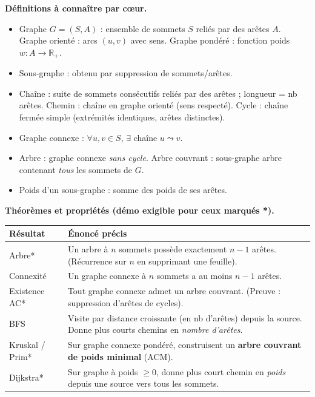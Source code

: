 \documentclass[11pt]{article}
\newcommand{\cle}[1]{{\popxbold\color{popdark}#1}}
\begin{document}
\begin{aretenir}
\textbf{Définitions à connaître par cœur.}
\begin{itemize}
  \item \cle{Graphe} $G = (S, A)$ : ensemble de \cle{sommets} $S$ reliés par des \cle{arêtes} $A$. Graphe \cle{orienté} : arcs $(u,v)$ avec sens. Graphe \cle{pondéré} : fonction poids $w: A \to \mathbb{R}_+$.
  \item \cle{Sous-graphe} : obtenu par suppression de sommets/arêtes.
  \item \cle{Chaîne} : suite de sommets consécutifs reliés par des arêtes ; \cle{longueur} = nb arêtes. \cle{Chemin} : chaîne en graphe orienté (sens respecté). \cle{Cycle} : chaîne fermée simple (extrémités identiques, arêtes distinctes).
  \item \cle{Graphe connexe} : $\forall u,v \in S$, $\exists$ chaîne $u \leadsto v$.
  \item \cle{Arbre} : graphe connexe \emph{sans cycle}. \cle{Arbre couvrant} : sous-graphe arbre contenant \emph{tous} les sommets de $G$.
  \item \cle{Poids d'un sous-graphe} : somme des poids de ses arêtes.
\end{itemize}

\textbf{Théorèmes et propriétés (démo exigible pour ceux marqués *).}
\begin{center}
\begin{tabularx}{\linewidth}{|l|X|}
\hline
\rowcolor{popblueL} \textbf{Résultat} & \textbf{Énoncé précis} \\
\hline
Arbre* & Un arbre à $n$ sommets possède exactement $n-1$ arêtes. (Récurrence sur $n$ en supprimant une feuille). \\
\hline
Connexité & Un graphe connexe à $n$ sommets a au moins $n-1$ arêtes. \\
\hline
Existence AC* & Tout graphe connexe admet un arbre couvrant. (Preuve : suppression d'arêtes de cycles). \\
\hline
BFS & Visite par distance croissante (en nb d'arêtes) depuis la source. Donne plus courts chemins en \emph{nombre d'arêtes}. \\
\hline
Kruskal / Prim* & Sur graphe connexe pondéré, construisent un \textbf{arbre couvrant de poids minimal} (ACM). \\
\hline
Dijkstra* & Sur graphe à poids $\ge 0$, donne plus court chemin en \emph{poids} depuis une source vers tous les sommets. \\
\hline
\end{tabularx}
\end{center}
\end{aretenir}
\end{document}
